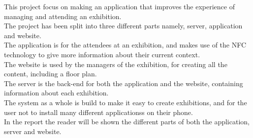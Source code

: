 This project focus on making an application that improves the experience of managing and attending an exhibition.\\
The project has been split into three different parts namely, server, application and website.\\
The application is for the attendees at an exhibition, and makes use of the NFC technology to give more information about their current context.\\
The website is used by the managers of the exhibition, for creating all the content, including a floor plan.\\
The server is the back-end for both the application and the website, containing information about each exhibition.\\
The system as a whole is build to make it easy to create exhibitions, and for the user not to install many different applicationss on their phone.\\
In the report the reader will be shown the different parts of both the application, server and website.